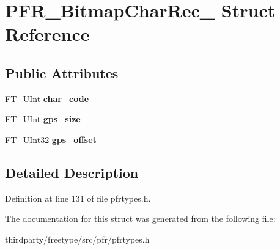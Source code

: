 \hypertarget{struct_p_f_r___bitmap_char_rec__}{}\section{P\+F\+R\+\_\+\+Bitmap\+Char\+Rec\+\_\+ Struct Reference}
\label{struct_p_f_r___bitmap_char_rec__}
\subsection*{Public Attributes}
\begin{DoxyCompactItemize}
\item 
\mbox{\label{struct_p_f_r___bitmap_char_rec___aacab70cdebb5a0fbc8b295c06fc3f24d}} 
F\+T\+\_\+\+U\+Int {\bfseries char\+\_\+code}
\item 
\mbox{\label{struct_p_f_r___bitmap_char_rec___a987af53e348eba5529cb542e5ac8a9f3}} 
F\+T\+\_\+\+U\+Int {\bfseries gps\+\_\+size}
\item 
\mbox{\label{struct_p_f_r___bitmap_char_rec___ad7957e4457fdae60f84befdcdfb08fc5}} 
F\+T\+\_\+\+U\+Int32 {\bfseries gps\+\_\+offset}
\end{DoxyCompactItemize}


\subsection{Detailed Description}


Definition at line 131 of file pfrtypes.\+h.



The documentation for this struct was generated from the following file\+:\begin{DoxyCompactItemize}
\item 
thirdparty/freetype/src/pfr/pfrtypes.\+h\end{DoxyCompactItemize}
